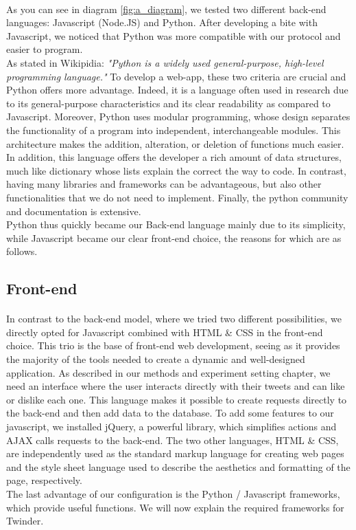 \paragraph{}
As you can see in diagram \ref{fig:a_diagram}, we tested two different back-end languages: Javascript (Node.JS) and Python. After developing a bite with Javascript, we noticed that Python was more compatible with our protocol and easier to program. \\
As stated in Wikipidia: \textit{"Python is a widely used general-purpose, high-level programming language."} To develop a web-app, these two criteria are crucial and Python offers more advantage. Indeed, it is a language often used in research due to its general-purpose characteristics and its clear readability as compared to Javascript. Moreover, Python uses modular programming, whose design separates the functionality of a program into independent, interchangeable modules. This architecture makes the addition, alteration, or deletion of functions much easier. In addition, this language offers the developer a rich amount of data structures, much like dictionary whose lists explain the correct the way to code. In contrast, having many libraries and frameworks can be advantageous, but also other functionalities that we do not need to implement. Finally, the python community and documentation is extensive. \\
Python thus quickly became our Back-end language mainly due to its simplicity, while Javascript became our clear front-end choice, the reasons for which are as follows.

\subsection{Front-end}

\paragraph{}
In contrast to the back-end model, where we tried two different possibilities, we directly opted for Javascript combined with HTML \& CSS in the front-end choice. This trio is the base of front-end web development, seeing as it provides the majority of the tools needed to create a dynamic and well-designed application. As described in our methods and experiment setting chapter, we need an interface where the user interacts directly with their tweets and can like or dislike each one. This language makes it possible to create requests directly to the back-end and then add data to the database. To add some features to our javascript, we installed jQuery, a powerful library, which simplifies actions and AJAX calls requests to the back-end. The two other languages, HTML \& CSS, are independently used as the standard markup language for creating web pages and the style sheet language used to describe the  aesthetics and formatting of the page, respectively. \\
The last advantage of our configuration is the Python / Javascript frameworks, which provide useful functions. We will now explain the required frameworks for Twinder.


